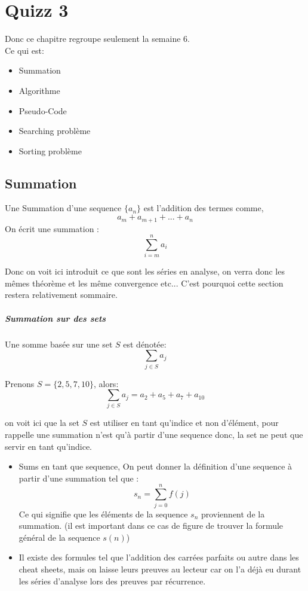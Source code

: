 \chapter{Quizz 3}
Donc ce chapitre regroupe seulement la semaine 6.
\\
Ce qui est:
\begin{itemize}
    \item Summation
    \item Algorithme
    \item Pseudo-Code
    \item Searching problème
    \item Sorting problème
\end{itemize}
\section{Summation}
\begin{definition}
    Une Summation d'une sequence $\{a_n\}$ est l'addition des termes comme, \[a_m + a_{m+1} + ... + a_n\]
    On écrit une summation :
    \[\sum_{i=m}^n a_i\]
\end{definition}
\begin{framedremark}
    Donc on voit ici introduit ce que sont les séries en analyse, on verra donc les mêmes théorème et les même convergence etc... C'est pourquoi cette section restera relativement sommaire.
\end{framedremark}
\paragraph{Summation sur des sets}
Une somme basée sur une set $S$ est dénotée:
\[\sum_{j\in S}a_j\]
\begin{exemple}
    Prenons $S = \{2, 5, 7, 10\}$, alors:
    \[\sum_{j\in S}a_j = a_2 + a_5 + a_7 + a_{10}\]
\end{exemple}
on voit ici que la set $S$ est utiliser en tant qu'indice et non d'élément, pour rappelle une summation n'est qu'à partir d'une sequence donc, la set ne peut que servir en tant qu'indice.
\\
\begin{resume}
    

\begin{itemize}
    \item Sums en tant que sequence, On peut donner la définition d'une sequence à partir d'une summation tel que : \[s_n = \sum_{j=0}^n f(j)\] Ce qui signifie que les éléments de la sequence $s_n$ proviennent de la summation. (il est important dans ce cas de figure de trouver la formule général de la sequence $s(n)$)
    \item Il existe des formules tel que l'addition des carrées parfaits ou autre dans les cheat sheets, mais on laisse leurs preuves au lecteur car on l'a déjà eu durant les séries d'analyse lors des preuves par récurrence.
\end{itemize}
\end{resume}
